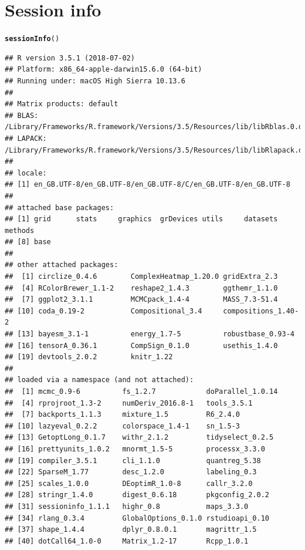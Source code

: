 \documentclass{article}\usepackage[]{graphicx}\usepackage[]{color}
\makeatletter
\newcommand{\hlstd}[1]{\textcolor[rgb]{0.345,0.345,0.345}{#1}}%
\newcommand{\hlkwd}[1]{\textcolor[rgb]{0.737,0.353,0.396}{\textbf{#1}}}%
\newenvironment{kframe}{%
 \def\at@end@of@kframe{}%
 \ifinner\ifhmode%
  \def\at@end@of@kframe{\end{minipage}}%
  \begin{minipage}{\columnwidth}%
 \fi\fi%
 \def\FrameCommand##1{\hskip\@totalleftmargin \hskip-\fboxsep
 \colorbox{shadecolor}{##1}\hskip-\fboxsep
     \hskip-\linewidth \hskip-\@totalleftmargin \hskip\columnwidth}%
 \MakeFramed {\advance\hsize-\width
   \@totalleftmargin\z@ \linewidth\hsize
   \@setminipage}}%
 {\par\unskip\endMakeFramed%
 \at@end@of@kframe}
\newenvironment{knitrout}{}{} %
\makeatother
\begin{document}
\section{Session info}
\begin{knitrout}
\color{fgcolor}\begin{kframe}
\begin{alltt}
  \hlkwd{sessionInfo}\hlstd{()}
\end{alltt}
\begin{verbatim}
## R version 3.5.1 (2018-07-02)
## Platform: x86_64-apple-darwin15.6.0 (64-bit)
## Running under: macOS High Sierra 10.13.6
## 
## Matrix products: default
## BLAS: /Library/Frameworks/R.framework/Versions/3.5/Resources/lib/libRblas.0.dylib
## LAPACK: /Library/Frameworks/R.framework/Versions/3.5/Resources/lib/libRlapack.dylib
## 
## locale:
## [1] en_GB.UTF-8/en_GB.UTF-8/en_GB.UTF-8/C/en_GB.UTF-8/en_GB.UTF-8
## 
## attached base packages:
## [1] grid      stats     graphics  grDevices utils     datasets  methods  
## [8] base     
## 
## other attached packages:
##  [1] circlize_0.4.6        ComplexHeatmap_1.20.0 gridExtra_2.3        
##  [4] RColorBrewer_1.1-2    reshape2_1.4.3        ggthemr_1.1.0        
##  [7] ggplot2_3.1.1         MCMCpack_1.4-4        MASS_7.3-51.4        
## [10] coda_0.19-2           Compositional_3.4     compositions_1.40-2  
## [13] bayesm_3.1-1          energy_1.7-5          robustbase_0.93-4    
## [16] tensorA_0.36.1        CompSign_0.1.0        usethis_1.4.0        
## [19] devtools_2.0.2        knitr_1.22           
## 
## loaded via a namespace (and not attached):
##  [1] mcmc_0.9-6          fs_1.2.7            doParallel_1.0.14  
##  [4] rprojroot_1.3-2     numDeriv_2016.8-1   tools_3.5.1        
##  [7] backports_1.1.3     mixture_1.5         R6_2.4.0           
## [10] lazyeval_0.2.2      colorspace_1.4-1    sn_1.5-3           
## [13] GetoptLong_0.1.7    withr_2.1.2         tidyselect_0.2.5   
## [16] prettyunits_1.0.2   mnormt_1.5-5        processx_3.3.0     
## [19] compiler_3.5.1      cli_1.1.0           quantreg_5.38      
## [22] SparseM_1.77        desc_1.2.0          labeling_0.3       
## [25] scales_1.0.0        DEoptimR_1.0-8      callr_3.2.0        
## [28] stringr_1.4.0       digest_0.6.18       pkgconfig_2.0.2    
## [31] sessioninfo_1.1.1   highr_0.8           maps_3.3.0         
## [34] rlang_0.3.4         GlobalOptions_0.1.0 rstudioapi_0.10    
## [37] shape_1.4.4         dplyr_0.8.0.1       magrittr_1.5       
## [40] dotCall64_1.0-0     Matrix_1.2-17       Rcpp_1.0.1         

\end{verbatim}
\end{kframe}
\end{knitrout}
\end{document}
